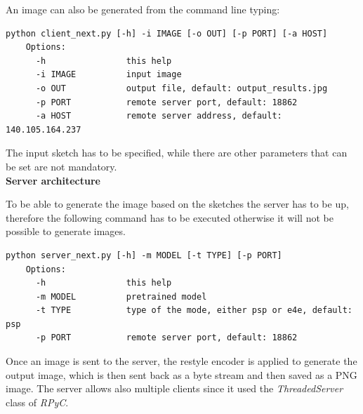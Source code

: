 \noindent An image can also be generated from the command line typing:
\begin{lstlisting}[numbers=none]
    python client_next.py [-h] -i IMAGE [-o OUT] [-p PORT] [-a HOST]
    Options:
      -h                this help
      -i IMAGE          input image
      -o OUT            output file, default: output_results.jpg
      -p PORT           remote server port, default: 18862
      -a HOST           remote server address, default: 140.105.164.237
\end{lstlisting}
The input sketch has to be specified, while there are other parameters that can be set are not mandatory.\\ 
%

\noindent\textbf{Server architecture}

\noindent To be able to generate the image based on the sketches the server has to be up, therefore the following command has to be executed otherwise it will not be possible to generate images.
\begin{lstlisting}[numbers=none]
    python server_next.py [-h] -m MODEL [-t TYPE] [-p PORT]
    Options:
      -h                this help
      -m MODEL          pretrained model
      -t TYPE           type of the mode, either psp or e4e, default: psp
      -p PORT           remote server port, default: 18862
\end{lstlisting}
Once an image is sent to the server, the restyle encoder is applied to generate the output image, which is then sent back as a byte stream and then saved as a PNG image. The server allows also multiple clients since it used the \textit{ThreadedServer} class of \textit{RPyC}.
